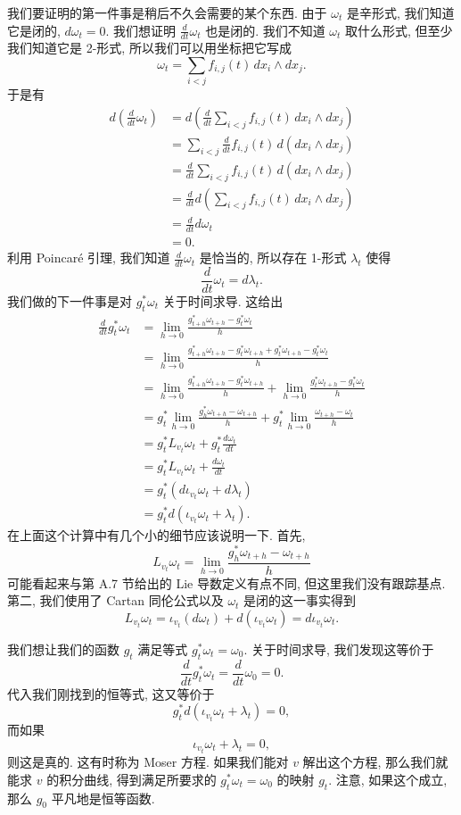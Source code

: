 我们要证明的第一件事是稍后不久会需要的某个东西. 由于 $\omega_t$ 是辛形式, 我们知道它是闭的, $d\omega_t=0$. 我们想证明 $\frac{d}{dt}\omega_t$ 也是闭的. 我们不知道 $\omega_t$ 取什么形式, 但至少我们知道它是 2-形式, 所以我们可以用坐标把它写成
\[
\omega_t=\sum_{i<j}f_{i,j}(t)\,dx_i\wedge dx_j.
\]
于是有
\[
\begin{aligned}
d\left(\frac{d}{dt}\omega_t\right)&=d\left(\frac{d}{dt}\sum_{i<j}f_{i,j}(t)\,dx_i\wedge dx_j\right)\\
&=\sum_{i<j}\frac{d}{dt}f_{i,j}(t)\,d\left(dx_i\wedge dx_j\right)\\
&=\frac{d}{dt}\sum_{i<j}f_{i,j}(t)\,d\left(dx_i\wedge dx_j\right)\\
&=\frac{d}{dt}d\left(\sum_{i<j}f_{i,j}(t)\,dx_i\wedge dx_j\right)\\
&=\frac{d}{dt}d\omega_t\\
&=0.
\end{aligned}
\]
利用 Poincaré 引理, 我们知道 $\frac{d}{dt}\omega_t$ 是恰当的, 所以存在 1-形式 $\lambda_t$ 使得
\[
\frac{d}{dt}\omega_t=d\lambda_t.
\]
我们做的下一件事是对 $g_t^*\omega_t$ 关于时间求导. 这给出
\[
\begin{aligned}
\frac{d}{dt}g_t^*\omega_t&=\lim_{h\to0}\frac{g_{t+h}^*\omega_{t+h}-g_t^*\omega_t}{h}\\
&=\lim_{h\to0}\frac{g_{t+h}^*\omega_{t+h}-g_t^*\omega_{t+h}+g_t^*\omega_{t+h}-g_t^*\omega_t}{h}\\
&=\lim_{h\to0}\frac{g_{t+h}^*\omega_{t+h}-g_t^*\omega_{t+h}}{h}+\lim_{h\to0}\frac{g_t^*\omega_{t+h}-g_t^*\omega_t}{h}\\
&=g_t^*\lim_{h\to0}\frac{g_h^*\omega_{t+h}-\omega_{t+h}}{h}+g_t^*\lim_{h\to0}\frac{\omega_{t+h}-\omega_t}{h}\\
&=g_t^*L_{v_t}\omega_t+g_t^*\frac{d\omega_t}{dt}\\
&=g_t^*L_{v_t}\omega_t+\frac{d\omega_t}{dt}\\
&=g_t^*\left(d\iota_{v_t}\omega_t+d\lambda_t\right)\\
&=g_t^*d\left(\iota_{v_t}\omega_t+\lambda_t\right).
\end{aligned}
\]
在上面这个计算中有几个小的细节应该说明一下. 首先, 
\[
L_{v_t}\omega_t=\lim_{h\to0}\frac{g_h^*\omega_{t+h}-\omega_{t+h}}{h}
\]
可能看起来与第 A.7 节给出的 Lie 导数定义有点不同, 但这里我们没有跟踪基点. 第二, 我们使用了 Cartan 同伦公式以及 $\omega_t$ 是闭的这一事实得到
\[
L_{v_t}\omega_t=\iota_{v_t}(d\omega_t)+d(\iota_{v_t}\omega_t)=d\iota_{v_t}\omega_t.
\]

我们想让我们的函数 $g_t$ 满足等式 $g_t^*\omega_t=\omega_0$. 关于时间求导, 我们发现这等价于
\[
\frac{d}{dt}g_t^*\omega_t=\frac{d}{dt}\omega_0=0.
\]
代入我们刚找到的恒等式, 这又等价于
\[
g_t^*d\left(\iota_{v_t}\omega_t+\lambda_t\right)=0,
\]
而如果
\[
\iota_{v_t}\omega_t+\lambda_t=0,
\]
则这是真的. 这有时称为 Moser 方程. 如果我们能对 $v$ 解出这个方程, 那么我们就能求 $v$ 的积分曲线, 得到满足所要求的 $g_t^*\omega_t=\omega_0$ 的映射 $g_t$. 注意, 如果这个成立, 那么 $g_0$ 平凡地是恒等函数.

